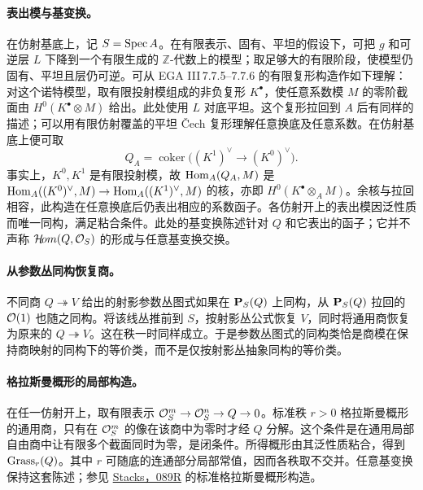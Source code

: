 \paragraph{表出模与基变换。}
在仿射基底上，记 \(S=\Spec A\)。在有限表示、固有、平坦的假设下，可把 \(g\) 和可逆层 \(L\) 下降到一个有限生成的 \(\mathbb Z\)-代数上的模型；取足够大的有限阶段，使模型仍固有、平坦且层仍可逆。可从 EGA III\,7.7.5--7.7.6 的有限复形构造作如下理解：对这个诺特模型，取有限投射模组成的非负复形 \(K^\bullet\)，使任意系数模 \(M\) 的零阶截面由 \(H^0(K^\bullet\otimes M)\) 给出。此处使用 \(L\) 对底平坦。这个复形拉回到 \(A\) 后有同样的描述；可以用有限仿射覆盖的平坦 \v{C}ech 复形理解任意换底及任意系数。在仿射基底上便可取
\[
 Q_A=\operatorname{coker}\bigl((K^1)^\vee\longrightarrow (K^0)^\vee\bigr).
\]
事实上，\(K^0,K^1\) 是有限投射模，故 \(\operatorname{Hom}_A(Q_A,M)\) 是
\(\operatorname{Hom}_A((K^0)^\vee,M)\to\operatorname{Hom}_A((K^1)^\vee,M)\) 的核，亦即 \(H^0(K^\bullet\otimes_A M)\)。余核与拉回相容，此构造在任意换底后仍表出相应的系数函子。各仿射开上的表出模因泛性质而唯一同构，满足粘合条件。此处的基变换陈述针对 \(Q\) 和它表出的函子；它并不声称 \(\HH(Q,\OO_S)\) 的形成与任意基变换交换。

\paragraph{从参数丛同构恢复商。}
不同商 \(Q\twoheadrightarrow V\) 给出的射影参数丛图式如果在 \(\PP_S(Q)\) 上同构，从 \(\PP_S(Q)\) 拉回的 \(\OO(1)\) 也随之同构。将该线丛推前到 \(S\)，按射影丛公式恢复 \(V\)，同时将通用商恢复为原来的 \(Q\twoheadrightarrow V\)。这在秩一时同样成立。于是参数丛图式的同构类恰是商模在保持商映射的同构下的等价类，而不是仅按射影丛抽象同构的等价类。

\paragraph{格拉斯曼概形的局部构造。}
在任一仿射开上，取有限表示 \(\OO_S^m\to\OO_S^n\to Q\to0\)。标准秩 \(r>0\) 格拉斯曼概形的通用商，只有在 \(\OO_S^m\) 的像在该商中为零时才经 \(Q\) 分解。这个条件是在通用局部自由商中让有限多个截面同时为零，是闭条件。所得概形由其泛性质粘合，得到 \(\operatorname{Grass}_r(Q)\)。其中 \(r\) 可随底的连通部分局部常值，因而各秩取不交并。任意基变换保持这套陈述；参见 \href{https://stacks.math.columbia.edu/tag/089R}{Stacks，089R} 的标准格拉斯曼概形构造。
\par\endgroup

\begingroup
\def\Spec{\operatorname{Spec}}
\def\Aut{\operatorname{Aut}}
\def\Div{\operatorname{Div}}
\def\OO{\mathcal O}
\def\PP{\mathbf P}
\hypertarget{audit:L18-083}{}
